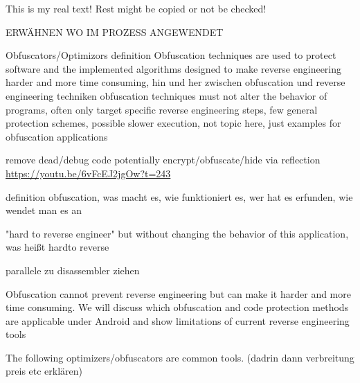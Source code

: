 This is my real text! Rest might be copied or not be checked!

ERWÄHNEN WO IM PROZESS ANGEWENDET\newline


Obfuscators/Optimizors definition\newline
Obfuscation techniques are used to protect software and the implemented algorithms\newline
designed to make reverse engineering harder and more time consuming, hin und her zwischen obfuscation und reverse engineering techniken\newline
obfuscation techniques must not alter the behavior of programs, often only target specific reverse engineering steps, few general protection schemes, possible slower execution, not topic here, just examples for obfuscation applications

remove dead/debug code\newline
potentially encrypt/obfuscate/hide via reflection\newline
\url{https://youtu.be/6vFcEJ2jgOw?t=243}\newline

definition obfuscation, was macht es, wie funktioniert es, wer hat es erfunden, wie wendet man es an\newline

"hard to reverse engineer" but without changing the behavior of this
application, was heißt hardto reverse\newline

parallele zu disassembler ziehen\newline

Obfuscation cannot prevent reverse engineering but can make it harder and more time consuming. We will discuss which obfuscation and code protection methods are applicable under Android and show limitations of current reverse engineering tools\newline

The following optimizers/obfuscators are common tools. (dadrin dann verbreitung preis etc erklären)
